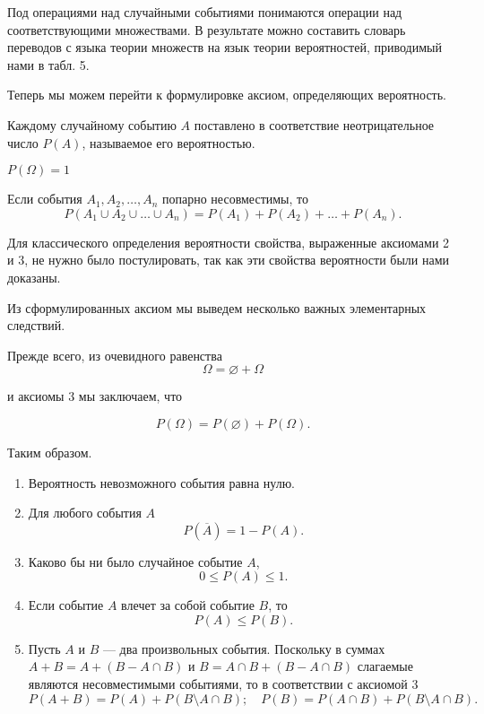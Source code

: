 Под операциями над случайными событиями понимаются операции над соответствующими множествами. В результате можно составить словарь переводов с языка теории множеств на язык теории вероятностей, приводимый нами в табл. 5.

Теперь мы можем перейти к формулировке аксиом, определяющих вероятность.
\begin{axiome} 
Каждому случайному событию $A$ поставлено в соответствие неотрицательное число $P(A)$, называемое его вероятностью.
\end{axiome}
\begin{axiome} 
$P(\Omega) = 1$
\end{axiome}
\begin{axiome} 
Если события $A_1,A_2, \ldots, A_n$ попарно несовместимы, то 
$$
P(A_1 \cup A_2 \cup \ldots \cup A_n) = P(A_1) + P(A_2) + \ldots + P(A_n).
$$
\end{axiome}
Для классического определения вероятности свойства, выраженные аксиомами 2 и 3, не нужно было постулировать, так как эти свойства вероятности были нами доказаны.

Из сформулированных аксиом мы выведем несколько важных элементарных следствий.

Прежде всего, из очевидного равенства
$$
\Omega = \varnothing + \Omega
$$

и аксиомы 3 мы заключаем, что

$$
P(\Omega) = P(\varnothing) + P(\Omega).
$$

Таким образом.
\begin{enumerate}
\item
Вероятность невозможного события равна нулю.
\item	
Для любого события $A$
$$
P(\overline{A}) = 1 - P(A).
$$
\item
Каково бы ни было случайное событие $A$,
$$
0 \le P(A) \le 1.
$$
\item
Если событие $A$ влечет за собой событие $B$, то
$$
P(A) \le P(B).
$$
\item
Пусть $A$ и $B$ --- два произвольных события. Поскольку в суммах $A + B = A + (B - A\cap B)$ и $B = A\cap B + (B - A\cap B)$ слагаемые являются несовместимыми событиями, то в соответствии с аксиомой 3
$$
P(A + B) = P(A) + P(B \setminus A\cap B);\quad P(B) = P(A\cap B) + P(B \setminus A\cap B).
$$
\end{enumerate}

